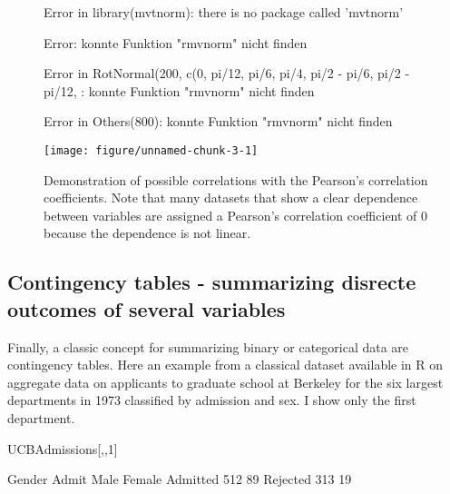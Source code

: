 \documentclass[a4paper,twoside]{tufte-book}\usepackage[]{graphicx}\usepackage[]{color}
\makeatletter
\def\maxwidth{ %
  \ifdim\Gin@nat@width>\linewidth
    \linewidth
  \else
    \Gin@nat@width
  \fi
}
\makeatother
\begin{document}
{\begin{figure}[htbp]
\begin{center}
\begin{Schunk}
\begin{Soutput}
Error in library(mvtnorm): there is no package called 'mvtnorm'
\end{Soutput}
\begin{Soutput}
Error: konnte Funktion "rmvnorm" nicht finden
\end{Soutput}
\begin{Soutput}
Error in RotNormal(200, c(0, pi/12, pi/6, pi/4, pi/2 - pi/6, pi/2 - pi/12, : konnte Funktion "rmvnorm" nicht finden
\end{Soutput}
\begin{Soutput}
Error in Others(800): konnte Funktion "rmvnorm" nicht finden
\end{Soutput}

\texttt{[image: figure/unnamed-chunk-3-1]} \end{Schunk}
\caption{Demonstration of possible correlations with the Pearson's correlation coefficients. Note that many datasets that show a clear dependence between variables are assigned a Pearson's correlation coefficient of 0 because the dependence is not linear.}
\label{fig: correlation}
\end{center}
\end{figure}

\subsection{Contingency tables - summarizing disrecte outcomes of several variables}

Finally, a classic concept for summarizing binary or categorical data are contingency tables. Here an example from a classical dataset available in R on aggregate data on applicants to graduate school at Berkeley for the six largest departments in 1973 classified by admission and sex. I show only the first department.

\begin{Schunk}
\begin{Sinput}
UCBAdmissions[,,1]
\end{Sinput}
\begin{Soutput}
          Gender
Admit      Male Female
  Admitted  512     89
  Rejected  313     19
\end{Soutput}
\end{Schunk}


}
\end{document}
